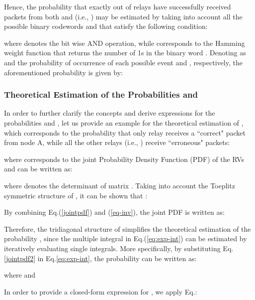 \documentclass[12pt,draftcls, onecolumn]{IEEEtran}
\begin{document}
Hence, the probability that exactly  out of  relays have successfully received packets from both  and  (i.e., ) may be estimated by taking into account all the possible binary codewords  and  that satisfy the following condition:


where  denotes the bit wise AND operation, while  corresponds to the Hamming weight function that returns the number of 1s in the binary word . Denoting as  and  the probability of occurrence of each possible event  and , respectively, the aforementioned probability is given by:

\vspace{-1pt}

\begingroup

\endgroup

\subsubsection{Theoretical Estimation of the Probabilities  and }
In order to further clarify the concepts and derive expressions for the probabilities  and , let us provide an example for the theoretical estimation of , which corresponds to the probability that only relay  receives a ``correct" packet from node A, while all the other relays (i.e., ) receive ``erroneous" packets:

\begingroup

\endgroup
where  corresponds to the joint Probability Density Function (PDF) of the RVs  and can be written as:

where  denotes the determinant of matrix . Taking into account the Toeplitz symmetric structure of , it can be shown that \cite{toeplitz}:

By combining Eq.(\ref{jointpdf}) and (\ref{eq-inv}), the joint PDF  is written as:
\begingroup

\endgroup
Therefore, the tridiagonal structure of  simplifies the theoretical estimation of the probability , since the multiple integral in Eq.(\ref{eq:exp-int}) can be estimated by iteratively evaluating single integrals. More specifically, by substituting Eq.\eqref{jointpdf2} in Eq.\eqref{eq:exp-int}, the probability  can be written as:
\begingroup

\endgroup
where  and

\begingroup

\endgroup

\noindent In order to provide a closed-form expression for , we apply Eq.\cite[(15.74)]{book2}:

\begingroup
\end{document}
